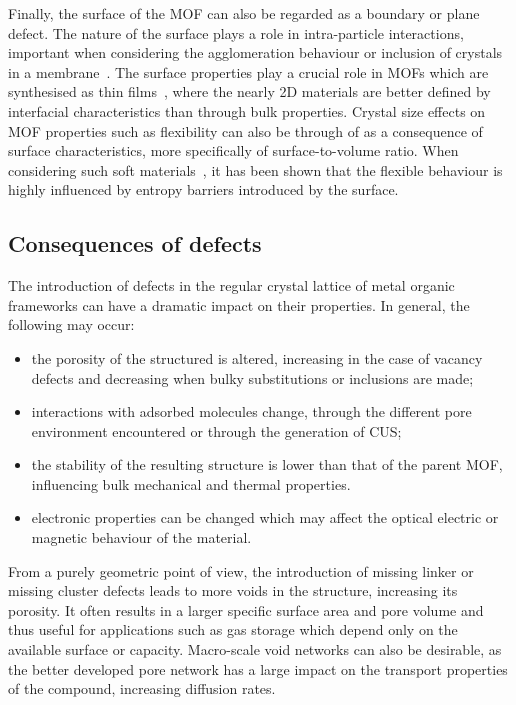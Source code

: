 Finally, the surface of the \gls{MOF} can also be regarded as a
boundary or plane defect. The nature of the surface plays a role
in intra-particle interactions, important when considering
the agglomeration behaviour or inclusion of crystals in
a membrane~\cite{seminoMicroscopicModelMetal2016}.
The surface properties play a crucial role in \glspl{MOF} which 
are synthesised as thin 
films~\cite{gliemannEpitaxiallyGrownMetalorganic2012, %
	stassenUpdatedRoadmapIntegration2017}, where the nearly
2D materials are better defined by interfacial characteristics
than through bulk properties.
Crystal size effects on \gls{MOF} properties such as flexibility
can also be through of as a consequence of surface characteristics, 
more specifically of surface-to-volume ratio. When considering 
such soft materials~\cite{krauseEffectCrystalliteSize2018, %
	vanduyfhuysThermodynamicInsightStimuliresponsive2018}, it has
been shown that the flexible behaviour is highly influenced
by entropy barriers introduced by the surface.

\subsection{Consequences of defects}

The introduction of defects in the regular crystal lattice of metal
organic frameworks can have a dramatic impact on their properties.
In general, the following may occur:

\begin{itemize}
	\item the porosity of the structured is altered, increasing
	      in the case of vacancy defects and decreasing when bulky
	      substitutions or inclusions are made;
	\item interactions with adsorbed molecules change,
	      through the different pore environment encountered or
	      through the generation of \gls{CUS};
	\item the stability of the resulting structure is lower
	      than that of the parent \gls{MOF}, influencing bulk mechanical
	      and thermal properties.
	\item electronic properties can be changed which may
	      affect the optical electric or magnetic behaviour of the
	      material.
\end{itemize}

From a purely geometric point of view, the introduction of missing
linker or missing cluster defects leads to more voids in the structure,
increasing its porosity. It often results in a larger
specific surface area and pore volume and thus useful for applications
such as gas storage which depend only on the available surface or
capacity. Macro-scale void networks can also be desirable, as the 
better developed pore network has a large impact on the transport
properties of the compound, increasing diffusion rates. 

